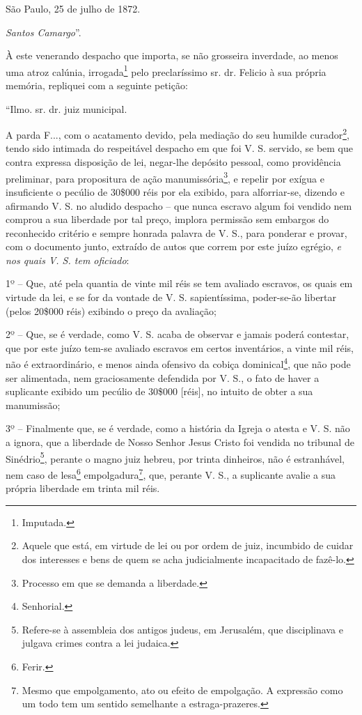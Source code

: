 São Paulo, 25 de julho de 1872.

\emph{Santos Camargo}''.

À este venerando despacho que importa, se não grosseira inverdade, ao
menos uma atroz calúnia, irrogada\footnote{ Imputada.} pelo
preclaríssimo sr. dr. Felicio à sua própria memória, repliquei com a
seguinte petição:

``Ilmo. sr. dr. juiz municipal.

A parda F..., com o acatamento devido, pela mediação do seu humilde
curador\footnote{ Aquele que está, em virtude de lei ou por ordem de
  juiz, incumbido de cuidar dos interesses e bens de quem se acha
  judicialmente incapacitado de fazê-lo.}, tendo sido intimada do
respeitável despacho em que foi V. S. servido, se bem que contra
expressa disposição de lei, negar-lhe depósito pessoal, como providência
preliminar, para propositura de ação manumissória\footnote{ Processo em
  que se demanda a liberdade.}, e repelir por exígua e insuficiente o
pecúlio de 30\$000 réis por ela exibido, para alforriar-se, dizendo e
afirmando V. S. no aludido despacho -- que nunca escravo algum foi
vendido nem comprou a sua liberdade por tal preço, implora permissão sem
embargos do reconhecido critério e sempre honrada palavra de V. S., para
ponderar e provar, com o documento junto, extraído de autos que correm
por este juízo egrégio, \emph{e nos quais V. S. tem oficiado}:

1º -- Que, até pela quantia de vinte mil réis se tem avaliado escravos,
os quais em virtude da lei, e se for da vontade de V. S. sapientíssima,
poder-se-ão libertar (pelos 20\$000 réis) exibindo o preço da avaliação;

2º -- Que, se é verdade, como V. S. acaba de observar e jamais poderá
contestar, que por este juízo tem-se avaliado escravos em certos
inventários, a vinte mil réis, não é extraordinário, e menos ainda
ofensivo da cobiça dominical\footnote{ Senhorial.}, que não pode ser
alimentada, nem graciosamente defendida por V. S., o fato de haver a
suplicante exibido um pecúlio de 30\$000 {[}réis{]}, no intuito de obter
a sua manumissão;

3º -- Finalmente que, se é verdade, como a história da Igreja o atesta e
V. S. não a ignora, que a liberdade de Nosso Senhor Jesus Cristo foi
vendida no tribunal de Sinédrio\footnote{ Refere-se à assembleia dos
  antigos judeus, em Jerusalém, que disciplinava e julgava crimes contra
  a lei judaica.}, perante o magno juiz hebreu, por trinta dinheiros,
não é estranhável, nem caso de lesa\footnote{ Ferir.}
empolgadura\footnote{ Mesmo que empolgamento, ato ou efeito de
  empolgação. A expressão como um todo tem um sentido semelhante a
  estraga-prazeres.}, que, perante V. S., a suplicante avalie a sua
própria liberdade em trinta mil réis.

